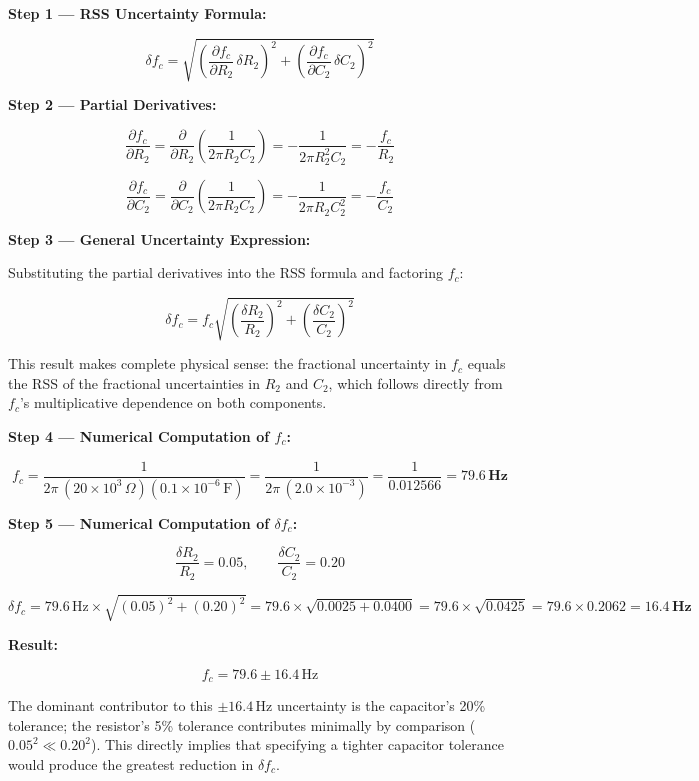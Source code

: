 \documentclass[11pt]{article}
\begin{document}
\textbf{Step 1 --- RSS Uncertainty Formula:}

\[
  \delta f_c = \sqrt{
    \left(\frac{\partial f_c}{\partial R_2}\,\delta R_2\right)^2
    +
    \left(\frac{\partial f_c}{\partial C_2}\,\delta C_2\right)^2
  }
\]

\textbf{Step 2 --- Partial Derivatives:}

\[
  \frac{\partial f_c}{\partial R_2}
  = \frac{\partial}{\partial R_2}\!\left(\frac{1}{2\pi R_2 C_2}\right)
  = -\frac{1}{2\pi R_2^2 C_2}
  = -\frac{f_c}{R_2}
\]

\[
  \frac{\partial f_c}{\partial C_2}
  = \frac{\partial}{\partial C_2}\!\left(\frac{1}{2\pi R_2 C_2}\right)
  = -\frac{1}{2\pi R_2 C_2^2}
  = -\frac{f_c}{C_2}
\]

\textbf{Step 3 --- General Uncertainty Expression:}

Substituting the partial derivatives into the RSS formula and factoring $f_c$:

\[
  \boxed{
    \delta f_c
    = f_c \sqrt{
      \left(\frac{\delta R_2}{R_2}\right)^2
      +
      \left(\frac{\delta C_2}{C_2}\right)^2
    }
  }
\]

This result makes complete physical sense: the fractional uncertainty in $f_c$ equals the RSS of the
fractional uncertainties in $R_2$ and $C_2$, which follows directly from $f_c$'s multiplicative
dependence on both components.

\textbf{Step 4 --- Numerical Computation of $f_c$:}

\[
  f_c
  = \frac{1}{2\pi\,(20 \times 10^3\,\Omega)(0.1 \times 10^{-6}\,\text{F})}
  = \frac{1}{2\pi\,(2.0 \times 10^{-3})}
  = \frac{1}{0.012566}
  = \mathbf{79.6\,\text{Hz}}
\]

\textbf{Step 5 --- Numerical Computation of $\delta f_c$:}

\[
  \frac{\delta R_2}{R_2} = 0.05, \qquad \frac{\delta C_2}{C_2} = 0.20
\]

\[
  \delta f_c
  = 79.6\,\text{Hz} \times \sqrt{(0.05)^2 + (0.20)^2}
  = 79.6 \times \sqrt{0.0025 + 0.0400}
  = 79.6 \times \sqrt{0.0425}
  = 79.6 \times 0.2062
  = \mathbf{16.4\,\text{Hz}}
\]

\textbf{Result:}

\[
  \boxed{f_c = 79.6 \pm 16.4\,\text{Hz}}
\]

The dominant contributor to this $\pm 16.4\,\text{Hz}$ uncertainty is the capacitor's 20\%
tolerance; the resistor's 5\% tolerance contributes minimally by comparison
($0.05^2 \ll 0.20^2$). This directly implies that specifying a tighter capacitor tolerance would
produce the greatest reduction in $\delta f_c$.
\end{document}

